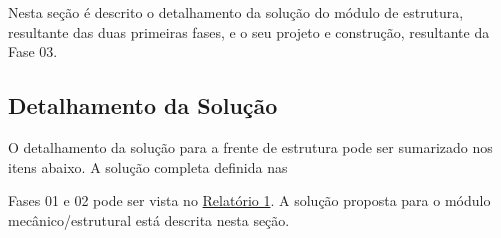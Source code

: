 \label{desenvolvimento_estrutura}
Nesta seção é descrito o detalhamento da solução do módulo de estrutura, resultante das duas primeiras fases,
e o seu projeto e construção, resultante da Fase 03.

\subsection{Detalhamento da Solução}

 O detalhamento da solução para a frente de estrutura pode ser sumarizado nos itens abaixo. A solução completa definida nas

  Fases 01 e 02 pode ser vista no \href{https://drive.google.com/file/d/0B5InkGKx6O-MR1B3eVYzZFpjQ3c/view?usp=sharing}{Relatório 1}.
 A solução proposta para o módulo mecânico/estrutural está descrita nesta seção.



